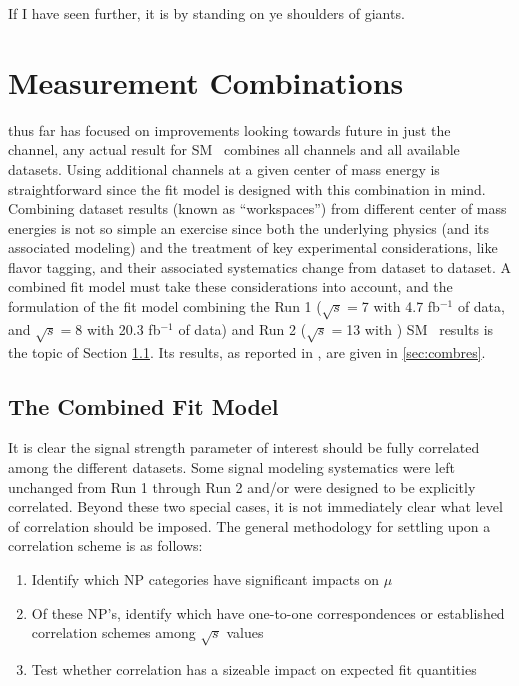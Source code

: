 \begin{savequote}[75mm]
If I have seen further, it is by standing on ye shoulders of giants.
\end{savequote}

\chapter{Measurement Combinations}
\label{ch:comb}
 thus far has focused on improvements looking towards future in just the \ZH\, channel, any actual result for SM \vhbb\, combines all channels and all available datasets.  Using additional channels at a given center of mass energy is straightforward since the fit model is designed with this combination in mind.  Combining dataset results (known as ``workspaces'') from different center of mass energies is not so simple an exercise since both the underlying physics (and its associated modeling) and the treatment of key experimental considerations, like flavor tagging, and their associated systematics change from dataset to dataset.  A combined fit model must take these considerations into account, and the formulation of the fit model combining the Run 1 ($\sqrt{s}=$7 \TeV with 4.7 fb$^{-1}$ of data, and $\sqrt{s}=$8 \TeV with 20.3 fb$^{-1}$ of data) and Run 2 ($\sqrt{s}=$13 \TeV with \lumi) SM \vhbb\, results is the topic of Section \ref{sec:combmodel}.  Its results, as reported in \cite{paper}, are given in \ref{sec:combres}.

\section{The Combined Fit Model}
\label{sec:combmodel}
It is clear the signal strength parameter of interest should be fully correlated among the different datasets.  Some signal modeling systematics were left unchanged from Run 1 through Run 2 and/or were designed to be explicitly correlated.  Beyond these two special cases, it is not immediately clear what level of correlation should be imposed.  The general methodology for settling upon a correlation scheme is as follows:

\begin{enumerate}
\item Identify which NP categories have significant impacts on $\mu$
\item Of these NP's, identify which have one-to-one correspondences or established correlation schemes among $\sqrt{s}$ values
\item Test whether correlation has a sizeable impact on expected fit quantities
\end{enumerate}

